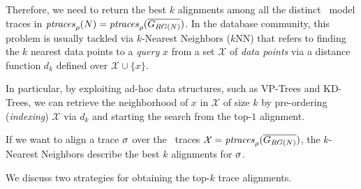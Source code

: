 Therefore, we need to return the best $k$ alignments among all the distinct \unravelled\ model traces in $\ptraces{\net}{\pmin}=\ptraces{\closed{\tg_{\rg{\net}}}}{\pmin}$. In the database community, this problem is usually tackled via $k$-Nearest Neighbors ($k$NN) that refers to finding the $k$ nearest data points to a \textit{query} $x$ from a set $\mathcal{X}$ of \textit{data points} via a distance function $d_k$ defined over $\mathcal{X}\cup\{x\}$. {In particular, by exploiting ad-hoc data structures, such as VP-Trees and KD-Trees, %
we can retrieve the neighborhood of $x$ in $\mathcal{X}$ of size $k$ by pre-ordering (\textit{indexing}) $\mathcal{X}$ via $d_k$ and starting the search from the top-$1$ alignment.


%	
If we want to align a trace $\logtrace$ over the \unravelled\ traces $\mathcal{X}=\WCal{\pmin}{n}$,
the $k$-Nearest Neighbors describe the best $k$ alignments for $\logtrace$.} We discuss two strategies for obtaining the
top-$k$ trace alignments.


